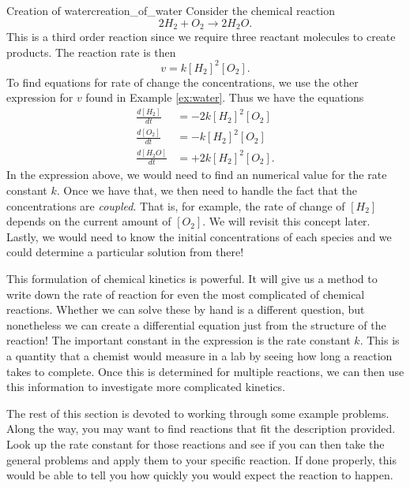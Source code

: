         \begin{ex}{Creation of water}{creation_of_water}
            Consider the chemical reaction
            \[
                2H_2 + O_2 \to 2H_2 O.
            \]
            This is a third order reaction since we require three reactant molecules to create products. The reaction rate is then
            \[
                v=k[H_2]^2 [O_2].
            \]
            To find equations for rate of change the concentrations, we use the other expression for $v$ found in Example \ref{ex:water}. Thus we have the equations
            \begin{align*}
                \frac{d[H_2]}{dt} &= -2 k [H_2]^2 [O_2]\\
                \frac{d[O_2]}{dt} &= -k[H_2]^2[O_2]\\
                \frac{d[H_2O]}{dt} &= +2k [H_2]^2[O_2].
            \end{align*}
            In the expression above, we would need to find an numerical value for the rate constant $k$. Once we have that, we then need to handle the fact that the concentrations are \emph{coupled}. That is, for example, the rate of change of $[H_2]$ depends on the current amount of $[O_2]$.  We will revisit this concept later. Lastly, we would need to know the initial concentrations of each species and we could determine a particular solution from there!
        \end{ex}

        This formulation of chemical kinetics is powerful.  It will give us a method to write down the rate of reaction for even the most complicated of chemical reactions.  Whether we can solve these by hand is a different question, but nonetheless we can create a differential equation just from the structure of the reaction! The important constant in the expression is the rate constant $k$.  This is a quantity that a chemist would measure in a lab by seeing how long a reaction takes to complete.  Once this is determined for multiple reactions, we can then use this information to investigate more complicated kinetics.

        The rest of this section is devoted to working through some example problems.  Along the way, you may want to find reactions that fit the description provided.  Look up the rate constant for those reactions and see if you can then take the general problems and apply them to your specific reaction. If done properly, this would be able to tell you how quickly you would expect the reaction to happen.

